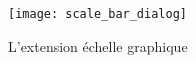 \begin{figure}[ht]
   \begin{center}
   \caption{L'extension échelle graphique \nixcaption}\label{fig:scale_bar}\smallskip
   \texttt{[image: scale\_bar\_dialog]}
\end{center}  
\end{figure}
